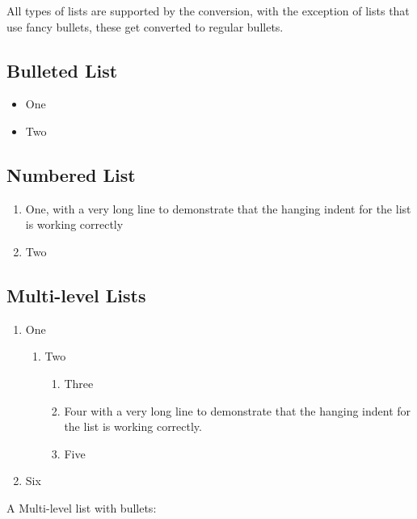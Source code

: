 \documentclass[11pt]{article}
\begin{document}
All types of lists are supported by the conversion, with the exception of lists that use fancy bullets, these get converted to regular bullets.

\subsection[{Bulleted List}]{\protect\textcolor{hex4F81BD}{Bulleted List}}\label{_Toc1958162433}\label{bulleted-list}

\begin{itemize}
\item One
\item Two
\end{itemize}

\subsection[{Numbered List}]{\protect\textcolor{hex4F81BD}{Numbered List}}\label{_Toc415190676}\label{numbered-list}

\begin{enumerate}
\item One, with a very long line to demonstrate that the hanging indent for the list is working correctly
\item Two
\end{enumerate}

\subsection[{Multi-level Lists}]{\protect\textcolor{hex4F81BD}{Multi-level Lists}}\label{_Toc1093260318}\label{multi-level-lists}

\begin{enumerate}
\item One
\begin{enumerate}
\item Two
\begin{enumerate}
\item Three
\item Four with a very long line to demonstrate that the hanging indent for the list is working correctly.
\item Five
\end{enumerate}
\end{enumerate}
\item Six
\end{enumerate}

{\leftskip=18pt A Multi-level list with bullets:\par}
\end{document}
